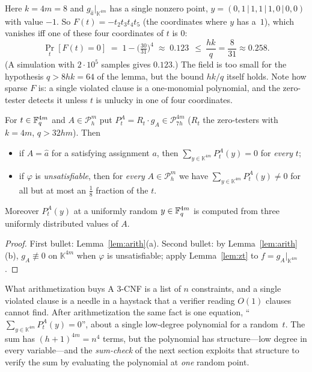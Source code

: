 \begin{example}\label{ex:zt}
Here $k=4m=8$ and $g_{\hat a}|_{\mathbb K^{4m}}$ has a single nonzero point, $y=(0,1\,|\,1,1\,|\,1,0\,|\,0,0)$ with value $-1$.  So $F(t)=-t_2t_3t_4t_5$ (the coordinates where $y$ has a~$1$), which vanishes iff one of these four
coordinates of $t$ is $0$:
\[
  \Pr_t[F(t)=0]\;=\;1-\bigl(\tfrac{30}{31}\bigr)^4\;\approx\;0.123\ \ \le\ \frac{hk}q=\frac8{31}\approx0.258 .
\]
(A simulation with $2\cdot10^5$ samples gives $0.123$.)  The field is too small for the hypothesis $q>8hk=64$ of the lemma, but the bound $hk/q$ itself holds.  Note how sparse $F$ is: a single violated clause
is a one-monomial polynomial, and the zero-tester detects it unless $t$ is unlucky in one of four coordinates.
\end{example}

\begin{corollary}\label{cor:P}
For $t\in\mathbb{F}_q^{4m}$ and $A\in\mathcal P^m_h$ put $P^A_t=R_t\cdot g_A\in\mathcal P^{4m}_{7h}$ ($R_t$ the zero-testers with $k=4m$, $q>32hm$).  Then
\begin{itemize}
  \item if $A=\hat a$ for a satisfying assignment $a$, then $\sum_{y\in\mathbb K^{4m}}P^A_t(y)=0$ for \emph{every} $t$;
  \item if $\varphi$ is \emph{unsatisfiable}, then for \emph{every} $A\in\mathcal P^m_h$ we have $\sum_{y\in\mathbb K^{4m}}P^A_t(y)\ne0$ for all but at most an $\tfrac18$ fraction of the $t$.
\end{itemize}
Moreover $P^A_t(y)$ at a uniformly random $y\in\mathbb{F}_q^{4m}$ is computed from three uniformly distributed values of $A$.
\end{corollary}
\begin{proof}
First bullet: Lemma~\ref{lem:arith}(a).  Second bullet: by Lemma~\ref{lem:arith}(b), $g_A\not\equiv0$ on $\mathbb K^{4m}$ when $\varphi$ is unsatisfiable; apply Lemma~\ref{lem:zt} to $f=g_A|_{\mathbb K^{4m}}$.
\end{proof}

\begin{bigpicture}{What arithmetization buys}
A $3$-CNF is a list of $n$ constraints, and a single violated clause is a needle in a haystack that a verifier reading $O(1)$ clauses cannot find.  After arithmetization the same fact is one equation,
``$\sum_{y\in\mathbb K^{4m}}P^A_t(y)=0$'', about a single low-degree polynomial for a random~$t$.  The sum has $(h+1)^{4m}=n^4$ terms, but the polynomial has structure---low degree in every variable---and
the \emph{sum-check} of the next section exploits that structure to verify the sum by evaluating the polynomial at \emph{one} random point.
\end{bigpicture}



